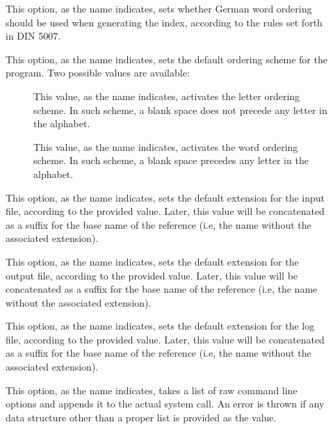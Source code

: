 \begin{description}
\begin{description}
\item[] This option, as the name indicates, sets whether German word ordering should be used when generating the index, according to the rules set forth in DIN 5007.

\item[] This option, as the name indicates, sets the default ordering scheme for the  program. Two possible values are available:

\begin{description}
\item[] This value, as the name indicates, activates the letter ordering scheme. In such scheme, a blank space does not precede any letter in the alphabet.

\item[] This value, as the name indicates, activates the word ordering scheme. In such scheme, a blank space precedes any letter in the alphabet.
\end{description}

\item[] This option, as the name indicates, sets the default extension for the input file, according to the provided value. Later, this value will be concatenated as a suffix for the base name of the  reference (i.e, the name without the associated extension).

\item[] This option, as the name indicates, sets the default extension for the output file, according to the provided value. Later, this value will be concatenated as a suffix for the base name of the  reference (i.e, the name without the associated extension).

\item[] This option, as the name indicates, sets the default extension for the log file, according to the provided value. Later, this value will be concatenated as a suffix for the base name of the  reference (i.e, the name without the associated extension).

\item[] This option, as the name indicates, takes a list of raw command line options and appends it to the actual system call. An error is thrown if any data structure other than a proper list is provided as the value.
\end{description}


\end{description}

